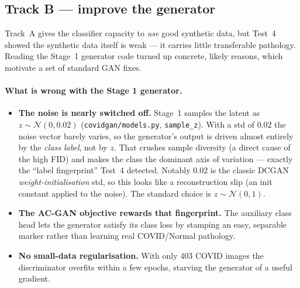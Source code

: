 \documentclass[11pt]{article}
\newcommand{\code}[1]{\texttt{#1}}
\begin{document}
\subsection{Track B --- improve the generator}
\label{sec:trackB}
Track~A gives the classifier capacity to \emph{use} good synthetic data, but
Test~4 showed the synthetic data itself is weak --- it carries little transferable
pathology. Reading the Stage~1 generator code turned up concrete, likely reasons,
which motivate a set of standard GAN fixes.

\paragraph{What is wrong with the Stage 1 generator.}
\begin{itemize}[nosep,leftmargin=1.4em]
  \item \textbf{The noise is nearly switched off.} Stage~1 samples the latent as
        $z \sim \mathcal{N}(0, 0.02)$ (\code{covidgan/models.py}, \code{sample\_z}).
        With a std of $0.02$ the noise vector barely varies, so the generator's
        output is driven almost entirely by the \emph{class label}, not by $z$.
        That crushes sample diversity (a direct cause of the high FID) and makes
        the class the dominant axis of variation --- exactly the ``label
        fingerprint'' Test~4 detected. Notably $0.02$ is the classic DCGAN
        \emph{weight-initialisation} std, so this looks like a reconstruction slip
        (an init constant applied to the noise). The standard choice is
        $z \sim \mathcal{N}(0,1)$.
  \item \textbf{The AC-GAN objective rewards that fingerprint.} The auxiliary
        class head lets the generator satisfy its class loss by stamping an easy,
        separable marker rather than learning real COVID/Normal pathology.
  \item \textbf{No small-data regularisation.} With only 403 COVID images the
        discriminator overfits within a few epochs, starving the generator of a
        useful gradient.
\end{itemize}
\end{document}
